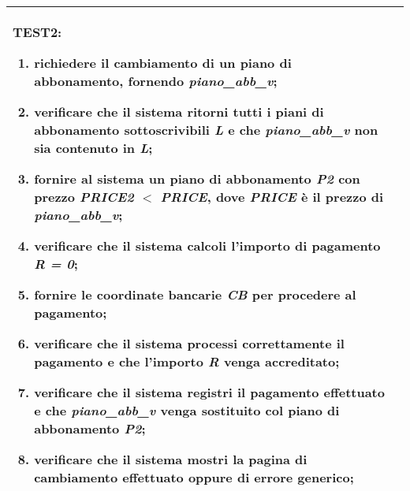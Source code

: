 \begin{table}[hb]
\begin{tabular}{ |p{2cm}|p{10cm}|  }
\begin{enumerate}[nosep, topsep=0pt]
        \end{enumerate}
        \vspace{0.5cm} TEST2:
        \begin{enumerate}[nosep, topsep=0pt]
            \item richiedere il cambiamento di un piano di abbonamento, fornendo \emph{piano\_abb\_v};
            \item verificare che il sistema ritorni tutti i piani di abbonamento sottoscrivibili \emph{L} e che \emph{piano\_abb\_v} non sia contenuto in \emph{L};
            \item fornire al sistema un piano di abbonamento \emph{P2} con prezzo \emph{PRICE2} $<$ \emph{PRICE}, dove \emph{PRICE} è il prezzo di \emph{piano\_abb\_v};
            \item verificare che il sistema calcoli l'importo di pagamento \emph{R = 0};
            \item fornire le coordinate bancarie \emph{CB} per procedere al pagamento;
            \item verificare che il sistema processi correttamente il pagamento e che l'importo \emph{R} venga accreditato;
            \item verificare che il sistema registri il pagamento effettuato e che \emph{piano\_abb\_v} venga sostituito col piano di abbonamento \emph{P2};
            \item verificare che il sistema mostri la pagina di cambiamento effettuato oppure di errore generico;
        \end{enumerate}
        \\\hline
    \end{tabular}
\end{table}

